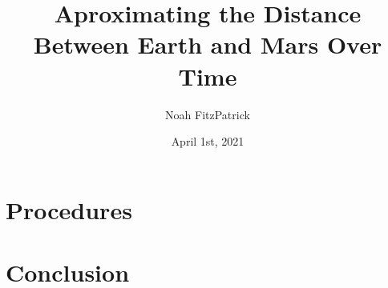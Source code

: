 \documentclass{article}
\author{Noah FitzPatrick}
\title{Aproximating the Distance Between Earth and Mars Over Time}
\date{April 1st, 2021}
\begin{document}
\maketitle

\section{Procedures}


\section{Conclusion}



\end{document}
